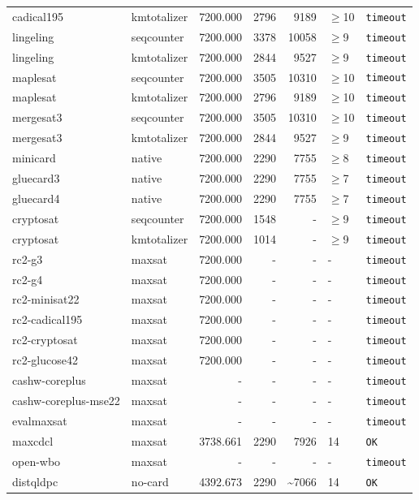 \begin{longtable}{llrrrl p{}}
cadical195 & kmtotalizer & 7200.000 & 2796 & 9189 & $\geq$10 & \texttt{timeout} \\
lingeling & seqcounter & 7200.000 & 3378 & 10058 & $\geq$9 & \texttt{timeout} \\
lingeling & kmtotalizer & 7200.000 & 2844 & 9527 & $\geq$9 & \texttt{timeout} \\
maplesat & seqcounter & 7200.000 & 3505 & 10310 & $\geq$10 & \texttt{timeout} \\
maplesat & kmtotalizer & 7200.000 & 2796 & 9189 & $\geq$10 & \texttt{timeout} \\
mergesat3 & seqcounter & 7200.000 & 3505 & 10310 & $\geq$10 & \texttt{timeout} \\
mergesat3 & kmtotalizer & 7200.000 & 2844 & 9527 & $\geq$9 & \texttt{timeout} \\
minicard & native & 7200.000 & 2290 & 7755 & $\geq$8 & \texttt{timeout} \\
gluecard3 & native & 7200.000 & 2290 & 7755 & $\geq$7 & \texttt{timeout} \\
gluecard4 & native & 7200.000 & 2290 & 7755 & $\geq$7 & \texttt{timeout} \\
cryptosat & seqcounter & 7200.000 & 1548 & - & $\geq$9 & \texttt{timeout} \\
cryptosat & kmtotalizer & 7200.000 & 1014 & - & $\geq$9 & \texttt{timeout} \\
rc2-g3 & maxsat & 7200.000 & - & - & - & \texttt{timeout} \\
rc2-g4 & maxsat & 7200.000 & - & - & - & \texttt{timeout} \\
rc2-minisat22 & maxsat & 7200.000 & - & - & - & \texttt{timeout} \\
rc2-cadical195 & maxsat & 7200.000 & - & - & - & \texttt{timeout} \\
rc2-cryptosat & maxsat & 7200.000 & - & - & - & \texttt{timeout} \\
rc2-glucose42 & maxsat & 7200.000 & - & - & - & \texttt{timeout} \\
cashw-coreplus & maxsat & - & - & - & - & \texttt{timeout} \\
cashw-coreplus-mse22 & maxsat & - & - & - & - & \texttt{timeout} \\
evalmaxsat & maxsat & - & - & - & - & \texttt{timeout} \\
maxcdcl & maxsat & 3738.661 & 2290 & 7926 & 14 & \texttt{OK} \\
open-wbo & maxsat & - & - & - & - & \texttt{timeout} \\
distqldpc & no-card & 4392.673 & 2290 & \textasciitilde{}7066 & 14 & \texttt{OK} \\

\end{longtable}

